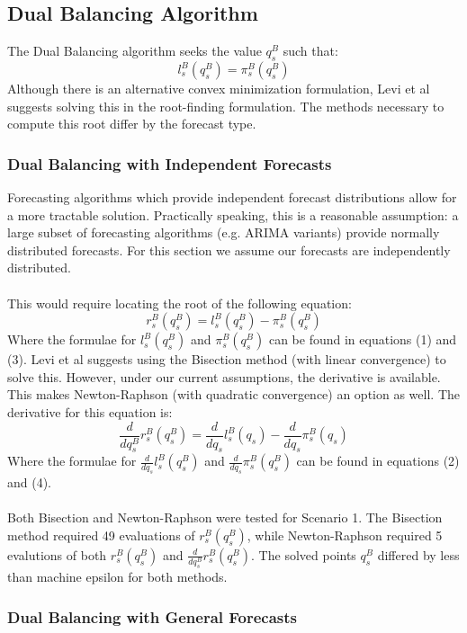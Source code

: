 \documentclass[12pt]{article}
\begin{document}
\subsection{Dual Balancing Algorithm}

The Dual Balancing algorithm seeks the value $q_s^B$ such that: 
$$
	l_s^B(q_s^B) = \pi_s^B(q_s^B)
$$
Although there is an alternative convex minimization formulation, Levi et al suggests solving this in the root-finding formulation. The methods necessary to compute this root differ by the forecast type.

\subsubsection{Dual Balancing with Independent Forecasts}

Forecasting algorithms which provide independent forecast distributions allow for a more tractable solution. Practically speaking, this is a reasonable assumption: a large subset of forecasting algorithms (e.g. ARIMA variants) provide normally distributed forecasts. For this section we assume our forecasts are independently distributed. \\
\\
This would require locating the root of the following equation:
$$
	r_s^B(q_s^B) = l_s^B(q_s^B) - \pi_s^B(q_s^B) 
$$
Where the formulae for $l_s^B(q_s^B)$ and $\pi_s^B(q_s^B)$ can be found in equations (1) and (3). Levi et al suggests using the Bisection method (with linear convergence) to solve this. However, under our current assumptions, the derivative is available. This makes Newton-Raphson (with quadratic convergence) an option as well. The derivative for this equation is:
$$
	\frac{d}{dq_s^B} r_s^B(q_s^B) =  \frac{d}{d q_s} l_s^B(q_s) - \frac{d}{d q_s} \pi_s^B(q_s) 
$$
Where the formulae for $ \frac{d}{d q_s} l_s^B(q_s^B)$ and $ \frac{d}{d q_s} \pi_s^B(q_s^B)$ can be found in equations (2) and (4).\\
\\
Both Bisection and Newton-Raphson were tested for Scenario 1. The Bisection method required 49 evaluations of $r_s^B(q_s^B)$, while Newton-Raphson required 5 evalutions of both $r_s^B(q_s^B)$ and $\frac{d}{dq_s^B} r_s^B(q_s^B)$. The solved points $q_s^B$ differed by less than machine epsilon for both methods.

\subsubsection{Dual Balancing with General Forecasts}
\end{document}

